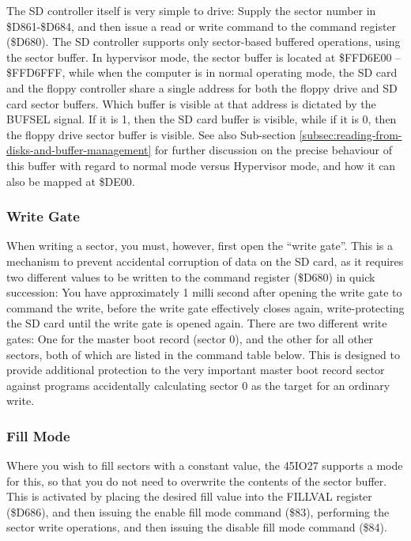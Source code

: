 The SD controller itself is very simple to drive: Supply the sector
number in \$D861-\$D684, and then issue a read or write command to the
command register (\$D680).  The SD controller supports only
sector-based buffered operations, using the sector buffer. In
hypervisor mode, the sector buffer is located at \$FFD6E00 --
\$FFD6FFF, while when the computer is in normal operating mode, the SD
card and the floppy controller share a single address for both the
floppy drive and SD card sector buffers. Which buffer is visible at
that address is dictated by the BUFSEL signal. If it is 1, then the SD
card buffer is visible, while if it is 0, then the floppy drive sector
buffer is visible.  See also Sub-section
\vref{subsec:reading-from-disks-and-buffer-management} for further
discussion on the precise behaviour of this buffer with regard to
normal mode versus Hypervisor mode, and how it can also be mapped at
\$DE00.

\subsubsection{Write Gate}

When writing a sector, you must, however, first open the ``write
gate''. This is a mechanism to prevent accidental corruption of data
on the SD card, as it requires two different values to be written to
the command register (\$D680) in quick succession: You have
approximately 1 milli second after opening the write gate to command
the write, before the write gate effectively closes again,
write-protecting the SD card until the write gate is opened again.
There are two different write gates: One for the master boot record
(sector 0), and the other for all other sectors, both of which are
listed in the command table below. This is designed to provide
additional protection to the very important master boot record sector
against programs accidentally calculating sector 0 as the target for
an ordinary write.

\subsubsection{Fill Mode}

Where you wish to fill sectors with a constant value, the 45IO27
supports a mode for this, so that you do not need to overwrite the
contents of the sector buffer. This is activated by placing the
desired fill value into the FILLVAL register (\$D686), and then
issuing the enable fill mode command (\$83), performing the sector
write operations, and then issuing the disable fill mode command
(\$84).

